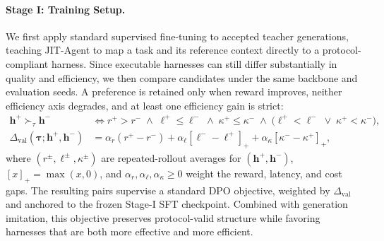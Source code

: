 \documentclass{article}
\newcommand{\ourmethod}{JIT-Agent\xspace}
\begin{document}
\vspace{-0.5em}
\paragraph{Stage I: Training Setup.}
We first apply standard supervised fine-tuning to accepted teacher generations, teaching \ourmethod to map a task and its reference context directly to a protocol-compliant harness. Since executable harnesses can still differ substantially in quality and efficiency, we then compare candidates under the same backbone and evaluation seeds. A preference is retained only when reward improves, neither efficiency axis degrades, and at least one efficiency gain is strict:
\begin{equation}
\label{eq:stage1_value_gap}
\begin{aligned}
\mathbf{h}^{+} \succ_{\tau} \mathbf{h}^{-}
&\iff
r^{+} > r^{-}
\;\land\;
\ell^{+}\leq\ell^{-}
\;\land\;
\kappa^{+}\leq\kappa^{-}
\;\land\;
\bigl(\ell^{+}<\ell^{-}\;\lor\;\kappa^{+}<\kappa^{-}\bigr), \\
\Delta_{\mathrm{val}}(\boldsymbol{\tau};\mathbf{h}^{+},\mathbf{h}^{-})
&= \alpha_r (r^{+} - r^{-})
+ \alpha_{\ell}[\ell^{-}-\ell^{+}]_{+}
+ \alpha_{\kappa}[\kappa^{-}-\kappa^{+}]_{+},
\end{aligned}
\end{equation}
where $(r^{\pm},\ell^{\pm},\kappa^{\pm})$ are repeated-rollout averages for $(\mathbf{h}^{+},\mathbf{h}^{-})$, $[x]_{+}=\max(x,0)$, and $\alpha_r,\alpha_{\ell},\alpha_{\kappa}\geq0$ weight the reward, latency, and cost gaps. The resulting pairs supervise a standard DPO objective, weighted by $\Delta_{\mathrm{val}}$ and anchored to the frozen Stage-I SFT checkpoint. Combined with generation imitation, this objective preserves protocol-valid structure while favoring harnesses that are both more effective and more efficient.


\vspace{-0.5em}
\end{document}
